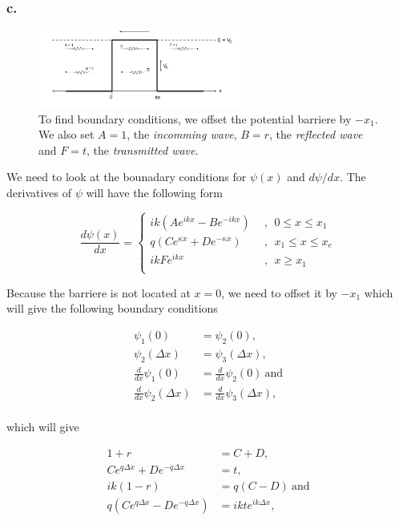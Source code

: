 \documentclass{article}
\begin{document}
\subsubsection*{c.}

\begin{figure}[t]
\centering
\includegraphics[width=0.6\textwidth]{potentialbarriereoffset}
\caption{To find boundary conditions, we offset the potential barriere by $-x_1$. We also set $A=1$, the \textit{incomming wave}, $B=r$, the \textit{reflected wave} and $F=t$, the \textit{transmitted wave}.}
\label{fig:figure_label}
\end{figure}

We need to look at the bounadary conditions for $\psi(x)$ and $d\psi/dx$. The derivatives of $\psi$ will have the following form

\begin{equation}
\frac{d\psi(x)}{dx} = \begin{cases}
ik(Ae^{ikx} - Be^{-ikx}) \ \ &, \ \ 0 \leq x \leq x_1 \\
q(Ce^{\kappa x} + De^{-\kappa x}) \ \ &, \ \ x_1 \leq x \leq x_e \\
ikFe^{ikx}  &, \ \ x \geq x_1 \\
\end{cases}
\end{equation}

Because the barriere is not located at $x=0$, we need to offset it by $-x_1$ which will give the following boundary conditions

\begin{align}
\psi_1(0) &= \psi_2(0), \\
\psi_2(\Delta x) &= \psi_3(\Delta x),\\
\frac{d}{dx}\psi_1(0) &= \frac{d}{dx}\psi_2(0) \ \text{and} \\
\frac{d}{dx}\psi_2(\Delta x) &= \frac{d}{dx}\psi_3(\Delta x), \\
\end{align}

which will give

\begin{align}
1 + r &= C + D, \label{eq_1} \\
Ce^{q\Delta x} + De^{-q\Delta x} &= t, \label{eq_2} \\
ik(1-r) &= q(C - D) \ \text{and} \label{eq_3} \\
q(Ce^{q\Delta x} - De^{-q\Delta x}) &= ikte^{ik\Delta x}, \label{eq_4} \\
\end{align}
\end{document}
